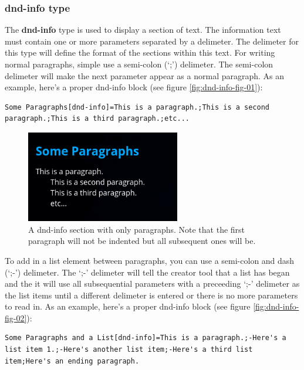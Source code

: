 \subsubsection{dnd-info type}

The \textbf{dnd-info} type is used to display a section of text. The information text must contain one or more parameters separated by a delimeter. The delimeter for this type will define the format of the sections within this text. For writing normal paragraphs, simple use a semi-colon (`;') delimeter. The semi-colon delimeter will make the next parameter appear as a normal paragraph. As an example, here's a proper dnd-info block (see figure \ref{fig:dnd-info-fig-01}):

\begin{lstlisting}
Some Paragraphs[dnd-info]=This is a paragraph.;This is a second paragraph.;This is a third paragraph.;etc...
\end{lstlisting}

\begin{figure}[h]
	\centering
	\includegraphics[width=0.6\textwidth]{images/dnd-info-section-01.png}
	\caption{A dnd-info section with only paragraphs. Note that the first paragraph will not be indented but all subsequent ones will be.}
	\label{fig:dnd-info-fig-1}
\end{figure}

To add in a list element between paragraphs, you can use a semi-colon and dash (`;-') delimeter. The `;-' delimeter will tell the creator tool that a list has began and the it will use all subsequential parameters with a preceeding `;-' delimeter as the list items until a different delimeter is entered or there is no more parameters to read in. As an example, here's a proper dnd-info block (see figure \ref{fig:dnd-info-fig-02}):

\begin{lstlisting}
Some Paragraphs and a List[dnd-info]=This is a paragraph.;-Here's a list item 1.;-Here's another list item;-Here's a third list item;Here's an ending paragraph.
\end{lstlisting}

